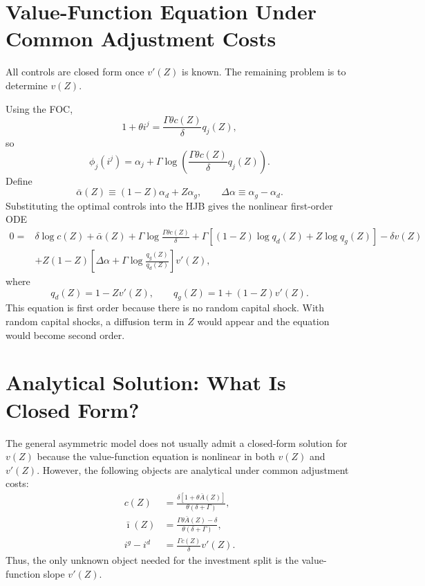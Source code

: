 \documentclass[11pt]{article}
\newcommand{\Abar}{\bar A}
\newcommand{\alphabar}{\bar\alpha}
\newcommand{\ibar}{\bar\imath}
\newcommand{\Delalpha}{\Delta\alpha}
\begin{document}
\section{Value-Function Equation Under Common Adjustment Costs}

All controls are closed form once $v'(Z)$ is known. The remaining problem is to determine $v(Z)$.

Using the FOC,
\begin{equation}
    1+\theta i^j
    =
    \frac{\Gamma\theta c(Z)}{\delta}q_j(Z),
\end{equation}
so
\begin{equation}
    \phi_j(i^j)
    =
    \alpha_j
    +
    \Gamma\log\left(
    \frac{\Gamma\theta c(Z)}{\delta}q_j(Z)
    \right).
\end{equation}
Define
\begin{equation}
    \alphabar(Z)\equiv (1-Z)\alpha_d+Z\alpha_g,
    \qquad
    \Delalpha\equiv \alpha_g-\alpha_d.
\end{equation}
Substituting the optimal controls into the HJB gives the nonlinear first-order ODE
\begin{equation}
    \boxed{
    \begin{aligned}
    0=
    &\delta\log c(Z)
    +\alphabar(Z)
    +\Gamma\log\frac{\Gamma\theta c(Z)}{\delta}
    +\Gamma\left[(1-Z)\log q_d(Z)+Z\log q_g(Z)\right]
    -\delta v(Z)
    \\
    &+Z(1-Z)
    \left[
    \Delalpha
    +\Gamma\log\frac{q_g(Z)}{q_d(Z)}
    \right]v'(Z),
    \end{aligned}
    }
\end{equation}
where
\begin{equation}
    q_d(Z)=1-Zv'(Z),
    \qquad
    q_g(Z)=1+(1-Z)v'(Z).
\end{equation}
This equation is first order because there is no random capital shock. With random capital shocks, a diffusion term in $Z$ would appear and the equation would become second order.

\section{Analytical Solution: What Is Closed Form?}

The general asymmetric model does not usually admit a closed-form solution for $v(Z)$ because the value-function equation is nonlinear in both $v(Z)$ and $v'(Z)$. However, the following objects are analytical under common adjustment costs:
\begin{align}
    c(Z)
    &=
    \frac{\delta\left[1+\theta\Abar(Z)\right]}{\theta(\delta+\Gamma)}, \\
    \ibar(Z)
    &=
    \frac{\Gamma\theta\Abar(Z)-\delta}{\theta(\delta+\Gamma)}, \\
    i^g-i^d
    &=
    \frac{\Gamma c(Z)}{\delta}v'(Z).
\end{align}
Thus, the only unknown object needed for the investment split is the value-function slope $v'(Z)$.
\end{document}

